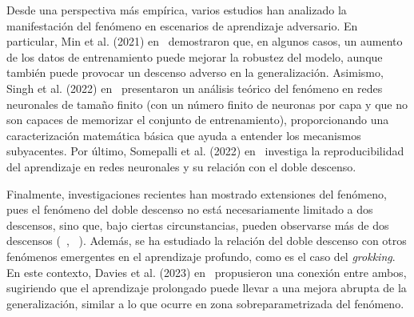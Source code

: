 Desde una perspectiva más empírica, varios estudios han analizado la manifestación del fenómeno en escenarios de aprendizaje adversario. En particular, Min et al. (2021) en~\cite{Ming2020} demostraron que, en algunos casos, un aumento de los datos de entrenamiento puede mejorar la robustez del modelo, aunque también puede provocar un descenso adverso en la generalización. Asimismo, Singh et al. (2022) en~\cite{Singh2022} presentaron un análisis teórico del fenómeno en redes neuronales de tamaño finito (con un número finito de neuronas por capa y que no son capaces de memorizar el conjunto de entrenamiento), proporcionando una caracterización matemática básica que ayuda a entender los mecanismos subyacentes. Por último, Somepalli et al. (2022) en~\cite{Somepalli2022} investiga la reproducibilidad del aprendizaje en redes neuronales y su relación con el doble descenso.\newline

Finalmente, investigaciones recientes han mostrado extensiones del fenómeno, pues el fenómeno del doble descenso no está necesariamente limitado a dos descensos, sino que, bajo ciertas circunstancias, pueden observarse más de dos descensos (~\cite{d_Ascoli2021}, ~\cite{Chen2021}). Además, se ha estudiado la relación del doble descenso con otros fenómenos emergentes en el aprendizaje profundo, como es el caso del \emph{grokking}. En este contexto, Davies et al. (2023) en~\cite{Davies2023} propusieron una conexión entre ambos, sugiriendo que el aprendizaje prolongado puede llevar a una mejora abrupta de la generalización, similar a lo que ocurre en zona sobreparametrizada del fenómeno.\newline

\endinput